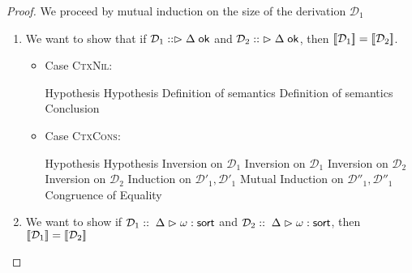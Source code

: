 \begin{proof}
We proceed by mutual induction on the size of the derivation $\mathcal{D}_1$

\begin{enumerate}
\item We want to show that if $\mathcal{D}_1 :: \vartriangleright {\Delta} \;\mathsf{ok}$
      and $\mathcal{D}_2 ::\; \vartriangleright {\Delta} \;\mathsf{ok}$, 
      then $[\![{\mathcal{D}_1}]\!] = [\![{\mathcal{D}_2}]\!]$.

\begin{itemize}
\item Case \textsc{CtxNil}:
  \begin{eqnproof}
           {Hypothesis}
           {Hypothesis}
          {Definition of semantics}
          {Definition of semantics}
          {Conclusion}
  \end{eqnproof}

\item Case \textsc{CtxCons}: 
  \begin{eqnproof}
           {Hypothesis}
           {Hypothesis}
           {Inversion on $\mathcal{D}_1$}
           {Inversion on $\mathcal{D}_1$}
           {Inversion on $\mathcal{D}_2$}
           {Inversion on $\mathcal{D}_2$}
           {Induction on $\mathcal{D}'_1, \mathcal{D}'_1$} 
           {Mutual Induction on $\mathcal{D}''_1, \mathcal{D}''_1$} 
           {Congruence of Equality}
  \end{eqnproof}
\end{itemize}

\item We want to show if $\mathcal{D}_1 ::\; {{\Delta}} \vartriangleright {{\omega}} : {\mathsf{sort}}$
      and $\mathcal{D}_2 ::\; {{\Delta}} \vartriangleright {{\omega}} : {\mathsf{sort}}$, 
      then $[\![{\mathcal{D}_1}]\!] = [\![{\mathcal{D}_2}]\!]$


\end{enumerate}
\end{proof}
